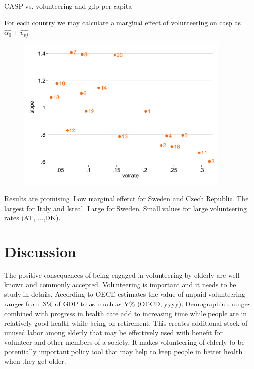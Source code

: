 \documentclass[10pt, letterpaper]{article}
\begin{document}
\begin{spacing}{1.4}
\begin{spacing}{.9}
\begin{table}[H]
\centering 
\caption{CASP vs. volunteering and gdp per capita}  
\begin{scriptsize} 
	 
      \label{regB} 
\end{scriptsize}
\end{table}
\end{spacing}

For each country we may calculate a marginal effect of volunteering on casp as $\hat{\alpha_{0}}+\hat{u_{vj}} $

\begin{figure}[H]
 \includegraphics[height=3in]{regHm3_slope.pdf}\centering\label{fig:m3}
\caption{}
\end{figure}

Results are promising. Low marginal efferct for Sweden and Czech Republic. The largest for Italy and Isreal. Large for Sweden. Small values for large volunteering rates (AT, ...,DK). 

\section{Discussion}

The positive consequences of being engaged in volunteering by elderly are well known and commonly accepted. Volunteering is important and it needs to be study in details.  According to OECD estimates the value of unpaid volunteering ranges from X\% of GDP to as much as Y\% (OECD, yyyy).  Demographic changes combined with progress in health care add to increasing time while people are in relatively good health while being on retirement. This creates additional  stock of unused labor among elderly that may be effectively used with benefit for volunteer and other members of a society.  It makes   volunteering of elderly to be potentially important policy tool that may help to keep people in better health when they get older. \\



\end{spacing}
\end{document}
